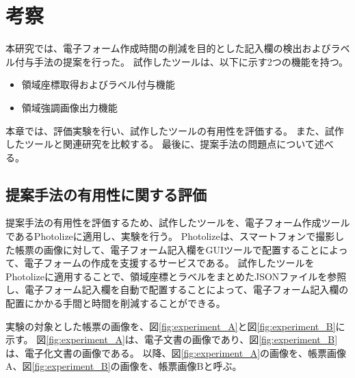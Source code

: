 \chapter{考察}\label{cha:Discussion}
本研究では、電子フォーム作成時間の削減を目的とした記入欄の検出およびラベル付与手法の提案を行った。
試作したツールは、以下に示す2つの機能を持つ。

\begin{itemize}
  \item 領域座標取得およびラベル付与機能
  \item 領域強調画像出力機能
\end{itemize}

本章では、評価実験を行い、試作したツールの有用性を評価する。
また、試作したツールと関連研究を比較する。
最後に、提案手法の問題点について述べる。

\section{提案手法の有用性に関する評価}\label{sec:evalue_usefulness}
提案手法の有用性を評価するため、試作したツールを、電子フォーム作成ツールであるPhotolize\cite{Photolize}に適用し、実験を行う。
Photolizeは、スマートフォンで撮影した帳票の画像に対して、電子フォーム記入欄をGUIツールで配置することによって、電子フォームの作成を支援するサービスである。
試作したツールをPhotolizeに適用することで、領域座標とラベルをまとめたJSONファイルを参照し、電子フォーム記入欄を自動で配置することによって、電子フォーム記入欄の配置にかかる手間と時間を削減することができる。

実験の対象とした帳票の画像を、図\ref{fig:experiment_A}と図\ref{fig:experiment_B}に示す。
図\ref{fig:experiment_A}は、電子文書の画像であり、図\ref{fig:experiment_B}は、電子化文書の画像である。
以降、図\ref{fig:experiment_A}の画像を、帳票画像A、図\ref{fig:experiment_B}の画像を、帳票画像Bと呼ぶ。

